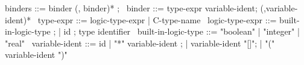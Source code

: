 \begin{syntax}
  binders ::= binder (, binder)* ;
  \
  binder ::= type-expr variable-ident;
             (,variable-ident)*
  \
  type-expr ::= logic-type-expr | C-type-name
  \
  logic-type-expr ::= built-in-logic-type ;
  | id ; type identifier
  \
  built-in-logic-type ::= "boolean" | "integer" | "real"
  \
  variable-ident ::= id
  | "*" variable-ident ;
  | variable-ident "[]";
  | "(" variable-ident ")"
\end{syntax}
